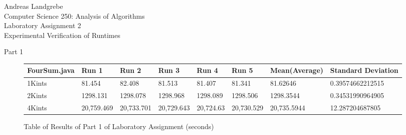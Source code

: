 \documentclass{article}
\begin{document}
\noindent
\begin{center}
Andreas Landgrebe
\\
Computer Science 250: Analysis of Algorithms
\\
Laboratory Assignment 2
\\
Experimental Verification of Runtimes

\end{center}

\newpage
\begin{center}
\Huge Part 1 
\end{center}
\begin{figure}[H]
\centering
\begin{adjustwidth}{-3cm}{}
\begin{tabular}{| l | l | l | l | l | l | l | l |}
\hline
FourSum.java & Run 1 & Run 2 & Run 3 & Run 4 & Run 5 & Mean(Average) & Standard Deviation \\ \hline
1Kints & 81.454 & 82.408 & 81.513 & 81.407 & 81.341 & 81.62646 & 0.39574662212515 \\ \hline
2Kints & 1298.131 & 1298.078 & 1298.968 & 1298.089 & 1298.506 & 1298.3544 & 0.34531990964905 
\\ \hline
4Kints & 20,759.469 & 20,733.701 & 20,729.643 & 20,724.63 & 20,730.529 & 20,735.5944 & 12.287204687805
\\ \hline

\end{tabular}
\caption{Table of Results of Part 1 of Laboratory Assignment (seconds)}
\end{adjustwidth}
\end{figure}
\end{document}
